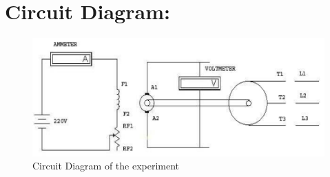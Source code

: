 \documentclass[a4paper,12pt]{article}
\begin{document}
	\section{Circuit Diagram:}
		\begin{figure}[H]
		\centering
		\includegraphics[width=0.9\linewidth]{Images/2} %
		\caption{Circuit Diagram of the experiment}
		\label{fig:2}
	\end{figure}
\end{document}
